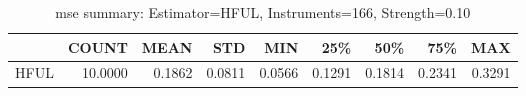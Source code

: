 \begin{table}[ht]
\centering
\caption{mse summary: Estimator=HFUL, Instruments=166, Strength=0.10}
\begin{tabular}{lrrrrrrrr}
\toprule
 & COUNT & MEAN & STD & MIN & 25\% & 50\% & 75\% & MAX \\
\midrule
HFUL & 10.0000 & 0.1862 & 0.0811 & 0.0566 & 0.1291 & 0.1814 & 0.2341 & 0.3291 \\
\bottomrule
\end{tabular}
\end{table}
